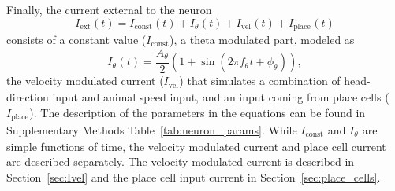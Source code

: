 \documentclass[a4paper,12pt]{article}
\newcommand{\ssc}[3]{\ensuremath{#1_{\text{#2}_{\text{#3}}}}}
\newcommand{\Iext}     {\ssc{I}      {ext}   {}}
\newcommand{\Iconst}   {\ssc{I}      {const} {}}
\newcommand{\Itheta}   {\ssc{I}      {$\theta$}{}}
\newcommand{\Atheta}   {\ssc{A}      {$\theta$}{}}
\newcommand{\ftheta}   {\ssc{f}      {$\theta$}{}}
\newcommand{\phitheta} {\ssc{\phi}   {$\theta$}{}}
\newcommand{\Ivel}     {\ssc{I}      {vel}   {}}
\newcommand{\Iplace}   {\ssc{I}      {place} {}}
\begin{document}
Finally, the current external to the neuron
\begin{equation}
    \Iext(t) = \Iconst(t) + \Itheta(t) + \Ivel(t) + \Iplace(t)
    \label{eq:Iext}
\end{equation}
consists of a constant value ($\Iconst$), a theta modulated part, modeled as
\begin{equation}
    \Itheta(t) = \frac{\Atheta}{2} (1 + \sin(2\pi\ftheta t + \phitheta)),
    \label{eq:Itheta}
\end{equation}
the velocity modulated current ($\Ivel$) that simulates a combination of
head-direction input and animal speed input, and an input coming from place
cells ($\Iplace$).  The description of the parameters in the equations can be
found in Supplementary Methods Table~\ref{tab:neuron_params}.
While $\Iconst$ and $\Itheta$ are simple functions of time, the velocity
modulated current and place cell current are described separately. The velocity
modulated current is described in Section~\ref{sec:Ivel} and the place cell
input current in Section~\ref{sec:place_cells}.
\end{document}
